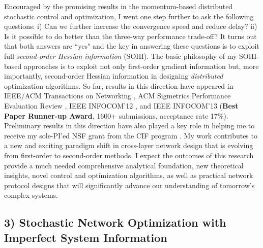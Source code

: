 \documentclass[10pt]{article}
\theoremstyle{plain} \numberwithin{equation}{section}
\theoremstyle{definition}
\begin{document}
Encouraged by the promising results in the momentum-based distributed stochastic control and optimization, I went one step further to ask the following questions:
i) Can we further increase the convergence speed and reduce delay? 
ii) Is it possible to do better than the three-way performance trade-off? 
It turns out that both answers are ``yes" and the key in answering these questions is to exploit full {\em second-order Hessian information} (SOHI).
The basic philosophy of my SOHI-based approaches is to exploit not only first-order gradient information but, more importantly, second-order Hessian information in designing {\em distributed} optimization algorithms.
So far, results in this direction have appeared in IEEE/ACM Transactions on Networking \cite{Liu16:DNewton_JCCR_ToN}, ACM Sigmetrics Performance Evaluation Review \cite{Liu13:PER}, IEEE INFOCOM'12 \cite{Liu12:DNewton_INFOCOM}, and IEEE INFOCOM'13 \cite{Liu13:DNewton_INFOCOM} ({\bf Best Paper Runner-up Award}, 1600+ submissions, acceptance rate 17\%).
Preliminary results in this direction have also played a key role in helping me to receive my sole-PI'ed NSF grant from the CIF program \cite{Liu16:CIF_Grant}.
My work contributes to a new and exciting paradigm shift in cross-layer network design that is evolving from first-order to second-order methods.
I expect the outcomes of this research provide a much needed comprehensive analytical foundation, new theoretical insights, novel control and optimization algorithms, as well as practical network protocol designs that will significantly advance our understanding of tomorrow's complex systems.


\subsection*{3) Stochastic Network Optimization with Imperfect System Information \cite{Liu09:MC_MIMO_Mobihoc,Liu16:M-MIMO,Liu15:NeTS_Grant}}
\end{document}
